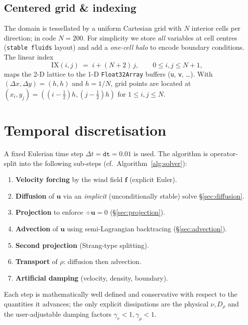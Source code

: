 \documentclass[11pt]{article}
\begin{document}
\subsection{Centered grid \& indexing}
The domain is tessellated by a uniform Cartesian grid with
$N$ interior cells per direction; in code $N=200$.
For simplicity we store \emph{all} variables at cell centres
(\texttt{stable fluids} layout) and add a \emph{one‐cell halo} to
encode boundary conditions.  The linear index
\[
    \mathrm{IX}(i,j) \;=\; i + (N+2)\,j,
    \qquad 0\le i,j\le N+1,
\]
maps the 2-D lattice to the 1-D
\texttt{Float32Array} buffers (\verb|u|, \verb|v|, \dots).
With $(\Delta x,\Delta y)=(h,h)$ and $h = 1/N$, grid points are located
at $(x_i,y_j) = ((i-\tfrac12)h,(j-\tfrac12)h)$ for $1\le i,j\le N$.

\section{Temporal discretisation}
A fixed Eulerian time step $\Delta t=\texttt{dt}=0.01$ is used.
The algorithm is operator-split into the following sub-steps
(cf.\ Algorithm~\ref{alg:solver}):

\begin{enumerate}
\item \textbf{Velocity forcing} by the wind field $\bm{f}$
      (explicit Euler).
\item \textbf{Diffusion} of $\bm{u}$ via an
      \emph{implicit} (unconditionally stable) solve
      §\ref{sec:diffusion}.
\item \textbf{Projection} to enforce $\div\bm{u}=0$
      (§\ref{sec:projection}).
\item \textbf{Advection} of $\bm{u}$
      using semi-Lagrangian backtracing (§\ref{sec:advection}).
\item \textbf{Second projection} (Strang-type splitting).
\item \textbf{Transport} of $\rho$:
      diffusion then advection.
\item \textbf{Artificial damping} (velocity, density, boundary).
\end{enumerate}

Each step is mathematically well defined and conservative with respect
to the quantities it advances; the only explicit dissipations are the
physical $\nu,D_\rho$ and the user-adjustable damping factors
$\gamma_v<1, \gamma_\rho<1$.

\end{document}
